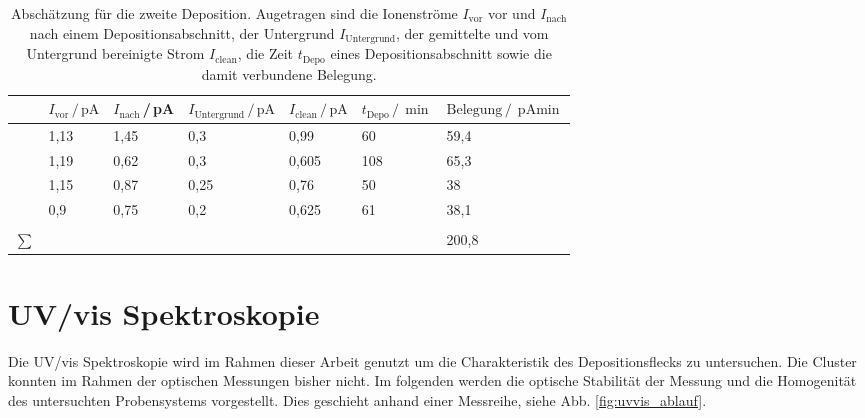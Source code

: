 \begin{table}
  \centering
  \caption{Abschätzung für die zweite Deposition. Augetragen sind die Ionenströme $I_{\text{vor}}$ vor und $I_{\text{nach}}$ nach einem Depositionsabschnitt, der Untergrund $I_{\text{Untergrund}}$, der gemittelte und vom Untergrund bereinigte Strom $I_{\text{clean}}$, die Zeit $t_{\text{Depo}}$ eines Depositionsabschnitt sowie die damit verbundene Belegung.}
  \label{tab:depo2}
  \begin{tabular}{lllllll}
      \toprule
      & $I_{\text{vor}}\,/\,\si{\pA}$	&	$I_{\text{nach}}$\,/\,\si{\pA}	& $I_{\text{Untergrund}}\,/\,\si{\pA}$		&	$I_{\text{clean}}\,/\,\si{\pA}$	&	$t_{\text{Depo}}\,/\,\si{\min}$	&	$\text{Belegung}\,/\,\si{\pA\min}$	\\
      \midrule
      &1,13	&	1,45	&	0,3	&	0,99	&	60	&	59,4	\\
      &1,19	&	0,62	&	0,3	&	0,605	&	108	&	65,3	\\
      &1,15	&	0,87	&	0,25	&	0,76	&	50	&	38	\\
      &0,9	&	0,75	&	0,2	&	0,625	&	61	&	38,1	\\
	    &      &			&		&		&		&		\\
	    $\sum$&     		&		&		&		&		&	200,8	\\
      \bottomrule
  \end{tabular}
\end{table}



\section{UV/vis Spektroskopie}
Die UV/vis Spektroskopie wird im Rahmen dieser Arbeit genutzt um die Charakteristik des Depositionsflecks zu untersuchen.
Die Cluster konnten im Rahmen der optischen Messungen bisher nicht.
Im folgenden werden die optische Stabilität der Messung und die Homogenität des untersuchten Probensystems vorgestellt.
Dies geschieht anhand einer Messreihe, siehe Abb. \ref{fig:uvvis_ablauf}.

